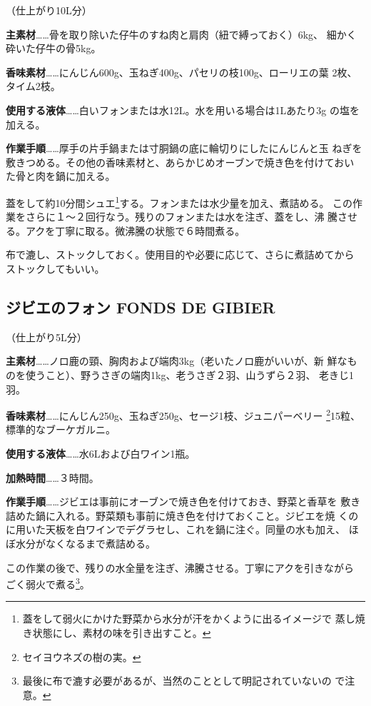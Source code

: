 \documentclass[twoside,12Q,b5paper]{escoffierltjsbook}
\newenvironment{recette}{\begin{multicols}{2}}{\end{multicols}}
\begin{document}
\begin{recette}
（仕上がり10L分）

\textbf{主素材}\ldots{}\ldots{}骨を取り除いた仔牛のすね肉と肩肉（紐で縛っておく）6kg、
細かく砕いた仔牛の骨5kg。

\textbf{香味素材}\ldots{}\ldots{}にんじん600g、玉ねぎ400g、パセリの枝100g、ローリエの葉
2枚、タイム2枝。

\textbf{使用する液体}\ldots{}\ldots{}白いフォンまたは水12L。水を用いる場合は1Lあたり3g
の塩を加える。

\textbf{作業手順}\ldots{}\ldots{}厚手の片手鍋または寸胴鍋の底に輪切りにしたにんじんと玉
ねぎを敷きつめる。その他の香味素材と、あらかじめオーブンで焼き色を付けておい
た骨と肉を鍋に加える。

蓋をして約10分間シュエ\footnote{蓋をして弱火にかけた野菜から水分が汗をかくように出るイメージで
  蒸し焼き状態にし、素材の味を引き出すこと。}する。フォンまたは水少量を加え、煮詰める。
この作業をさらに１〜２回行なう。残りのフォンまたは水を注ぎ、蓋をし、沸
騰させる。アクを丁寧に取る。微沸騰の状態で６時間煮る。

布で漉し、ストックしておく。使用目的や必要に応じて、さらに煮詰めてから
ストックしてもいい。

\subsection{ジビエのフォン FONDS DE
GIBIER}\label{ux30b8ux30d3ux30a8ux306eux30d5ux30a9ux30f3-fonds-de-gibier}

（仕上がり5L分）

\textbf{主素材}\ldots{}\ldots{}ノロ鹿の頸、胸肉および端肉3kg（老いたノロ鹿がいいが、新
鮮なものを使うこと）、野うさぎの端肉1kg、老うさぎ２羽、山うずら２羽、
老きじ1羽。

\textbf{香味素材}\ldots{}\ldots{}にんじん250g、玉ねぎ250g、セージ1枝、ジュニパーベリー
\footnote{セイヨウネズの樹の実。}15粒、標準的なブーケガルニ。

\textbf{使用する液体}\ldots{}\ldots{}水6Lおよび白ワイン1瓶。

\textbf{加熱時間}\ldots{}\ldots{}３時間。

\textbf{作業手順}\ldots{}\ldots{}ジビエは事前にオーブンで焼き色を付けておき、野菜と香草を
敷き詰めた鍋に入れる。野菜類も事前に焼き色を付けておくこと。ジビエを焼
くのに用いた天板を白ワインでデグラセし、これを鍋に注ぐ。同量の水も加え、
ほぼ水分がなくなるまで煮詰める。

この作業の後で、残りの水全量を注ぎ、沸騰させる。丁寧にアクを引きながら
ごく弱火で煮る\footnote{最後に布で漉す必要があるが、当然のこととして明記されていないの
  で注意。}。


\end{recette}
\end{document}
